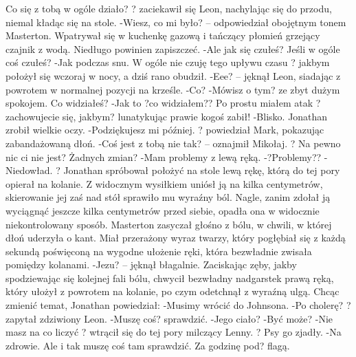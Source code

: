 \documentclass[../MAIN.tex]{subfiles}
\begin{document}
Co się z tobą w ogóle działo? ? zaciekawił się Leon, nachylając się do przodu, niemal kładąc się na stole.
-Wiesz, co mi było? -- odpowiedział obojętnym tonem Masterton. Wpatrywał się w kuchenkę gazową i tańczący płomień grzejący czajnik z wodą. Niedługo powinien zapiszczeć.
-Ale jak się czułeś? Jeśli w ogóle coś czułeś?
-Jak podczas snu. W ogóle nie czuję tego upływu czasu ? jakbym położył się wczoraj w nocy, a dziś rano obudził.
-Eee? -- jęknął Leon, siadając z powrotem w normalnej pozycji na krześle.
-Co?
-Mówisz o tym? ze zbyt dużym spokojem. Co widziałeś?
-Jak to ?co widziałem?? Po prostu miałem atak ? zachowujecie się, jakbym? lunatykując prawie kogoś zabił!
-Blisko.
Jonathan zrobił wielkie oczy.
-Podziękujesz mi później. ? powiedział Mark, pokazując zabandażowaną dłoń.
-Coś jest z tobą nie tak? -- oznajmił Mikołaj. ? Na pewno nic ci nie jest? Żadnych zmian?
-Mam problemy z lewą ręką.
-?Problemy??
-Niedowład. ? Jonathan spróbował położyć na stole lewą rękę, którą do tej pory opierał na kolanie. Z widocznym wysiłkiem uniósł ją na kilka centymetrów, skierowanie jej zaś nad stół sprawiło mu wyraźny ból. Nagle, zanim zdołał ją wyciągnąć jeszcze kilka centymetrów przed siebie, opadła ona w widocznie niekontrolowany sposób.
Masterton zasyczał głośno z bólu, w chwili, w której dłoń uderzyła o kant. Miał przerażony wyraz twarzy, który pogłębiał się z każdą sekundą poświęconą na wygodne ułożenie ręki, która bezwładnie zwisała pomiędzy kolanami.
-Jezu? -- jęknął błagalnie. Zaciskając zęby, jakby spodziewając się kolejnej fali bólu, chwycił bezwładny nadgarstek prawą ręką, który ułożył z powrotem na kolanie, po czym odetchnął z wyraźną ulgą.
Chcąc zmienić temat, Jonathan powiedział:
-Musimy wrócić do Johnsona.
-Po cholerę? ? zapytał zdziwiony Leon.
-Muszę coś? sprawdzić.
-Jego ciało?
-Być może?
-Nie masz na co liczyć ? wtrącił się do tej pory milczący Lenny. ? Psy go zjadły.
-Na zdrowie. Ale i tak muszę coś tam sprawdzić. Za godzinę pod? flagą.
\end{document}
